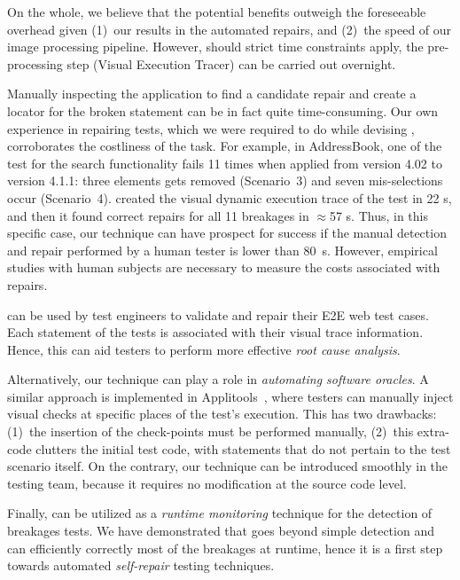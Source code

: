 On the whole, we believe that the potential benefits outweigh the foreseeable overhead given (1)~our results in the automated repairs, and (2)~the speed of our image processing pipeline. However, should strict time constraints apply, the pre-processing step (Visual Execution Tracer) can be carried out overnight.

Manually inspecting the application to find a candidate repair  and create a locator for the broken statement can be in fact quite time-consuming. Our own experience in repairing tests, which we were required to do while devising \tool, corroborates the costliness of the task. For example, in AddressBook, one of the test for the search functionality fails 11 times when applied from version 4.02 to version 4.1.1: three elements gets removed (Scenario~3) and seven mis-selections occur (Scenario~4). \tool created the visual dynamic execution trace of the test in 22 s, and then it found correct repairs for all 11 breakages in $\approx$57 s. Thus, in this specific case, our technique can have prospect for success if the manual detection and repair performed by a human tester is lower than 80~s. However, empirical studies with human subjects are necessary to measure the costs associated with repairs.

\tool can be used by test engineers to validate and repair their E2E web test cases. Each statement of the tests is associated with their visual trace information. Hence, this can aid testers to perform more effective \textit{root cause analysis}.

Alternatively, our technique can play a role in \textit{automating software oracles}. A similar approach is implemented in Applitools~\cite{applitools}, where testers can manually inject visual checks at specific places of the test's execution. This has two drawbacks: (1)~the insertion of the check-points must be performed manually, (2)~this extra-code clutters the initial test code, with statements that do not pertain to the test scenario itself. On the contrary, our technique can be introduced smoothly in the testing team, because it requires no modification at the source code level. 

Finally, \tool can be utilized as a \textit{runtime monitoring}  technique for the detection of breakages tests. We have demonstrated that \tool goes beyond simple detection and can efficiently correctly most of the breakages at runtime, hence it is a first step towards automated \textit{self-repair} testing techniques. 

